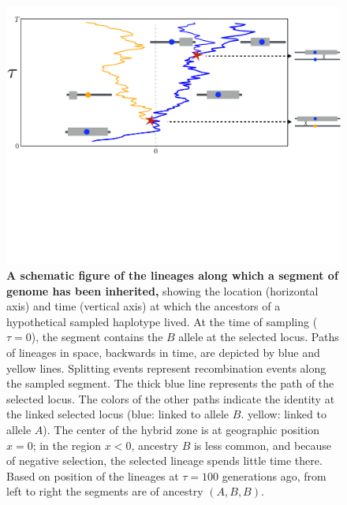 \documentclass[11pt,letterpaper]{article}
\begin{document}
\begin{figure}
\includegraphics[clip,width=\textwidth,trim=0cm 8cm 0cm 0.05cm]{figs/BM_schematic_new2.pdf}
\caption{
    \textbf{A schematic figure of the lineages along which a segment of genome has been inherited,}
    showing the location (horizontal axis) and time (vertical axis) at which the ancestors 
    of a hypothetical sampled haplotype lived.
    At the time of sampling ($\tau=0$), the segment contains the $B$ allele at the selected locus.
    Paths of lineages in space, backwards in time, are depicted by blue and yellow lines. Splitting 
    events  represent recombination events along the sampled segment.
    The thick blue line represents the path of the selected locus. The colors of the other paths indicate 
    the identity at the linked selected locus (blue: linked to allele $B$. yellow: linked to allele $A$). 
    The center of the hybrid zone is at geographic position $x=0$; in the region $x<0$, ancestry $B$ is less common,
    and because of negative selection, the selected lineage spends little time there.
    Based on position of the lineages at $\tau=100$ generations ago,
    from left to right the segments are of ancestry $(A,B,B)$.
}\label{Fig:schematic}
\end{figure}
\end{document}
